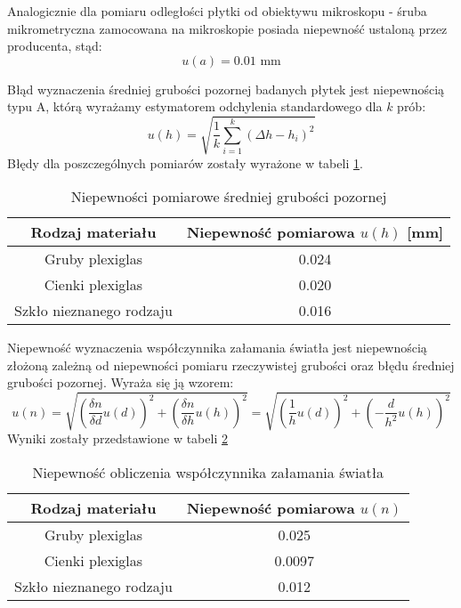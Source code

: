 \documentclass[a4paper,12pts]{article}
\begin{document}
	Analogicznie dla pomiaru odległości płytki od obiektywu mikroskopu - śruba mikrometryczna zamocowana na mikroskopie posiada niepewność ustaloną przez producenta, stąd:
	\begin{equation}
		u(a) = 0.01 \textrm{ mm}
	\end{equation}
	
	Błąd wyznaczenia średniej grubości pozornej badanych płytek jest niepewnością typu A, którą wyrażamy estymatorem odchylenia standardowego dla $k$ prób:
	\begin{equation}
		u(h) = \sqrt{\frac{1}{k}\sum_{i=1}^{k}(\Delta h - h_i)^2}
	\end{equation}
	Błędy dla poszczególnych pomiarów zostały wyrażone w tabeli \ref{niepewność_h}.
	\begin{table}[!h]
		\centering
		\begin{tabular}{|c|c|}
			\hline
			Rodzaj materiału  &  Niepewność pomiarowa $u(h)$ [mm] \\ \hline
			Gruby plexiglas   &  0.024 \\ \hline
			Cienki plexiglas  &  0.020 \\ \hline
			Szkło nieznanego rodzaju & 0.016 \\ \hline
		\end{tabular}
		\caption{Niepewności pomiarowe średniej grubości pozornej}
		\label{niepewność_h}
	\end{table}

	Niepewność wyznaczenia współczynnika załamania światła jest niepewnością złożoną zależną od niepewności pomiaru rzeczywistej grubości oraz błędu średniej grubości pozornej. Wyraża się ją wzorem:
	\begin{equation}
		u(n) = \sqrt{\left(\frac{\delta n }{\delta d} u(d) \right)^2 + \left(\frac{\delta n}{\delta h} u(h)\right)^2} = \sqrt{\left(\frac{1}{h}u(d)\right)^2 + \left(-\frac{d}{h^2}u(h)\right)^2}
	\end{equation}
	Wyniki zostały przedstawione w tabeli \ref{niepewność_n}
	\begin{table}[!h]
		\centering
		\begin{tabular}{|c|c|}
			\hline
			Rodzaj materiału & Niepewność pomiarowa $u(n)$ \\ \hline
			Gruby plexiglas & 0.025 \\ \hline
			Cienki plexiglas & 0.0097 \\ \hline
			Szkło nieznanego rodzaju & 0.012 \\ \hline
		\end{tabular}
		\caption{Niepewność obliczenia współczynnika załamania światła}
		\label{niepewność_n}
	\end{table}
\end{document}
